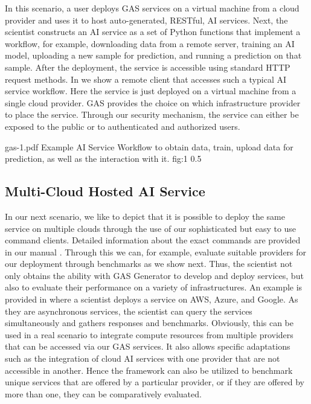 In this scenario, a user deploys GAS services on a virtual
machine from a cloud provider and uses it to host auto-generated,
RESTful, AI services. Next, the scientist constructs an AI service as
a set of Python functions that implement a workflow, for example,
downloading data from a remote server, training an AI model, uploading
a new sample for prediction, and running a prediction on that
sample. After the deployment, the service is accessible using standard
HTTP request methods. In  we show a remote client that
accesses such a typical AI service workflow.  Here the service is just
deployed on a virtual machine from a single cloud provider. GAS
provides the choice on which infrastructure provider to place the
service. Through our security mechanism, the service can either be
exposed to the public or to authenticated and authorized users.

\OneFIGURE
  {gas-1.pdf}
  {Example AI Service Workflow to obtain data, train, upload data for prediction, as well as the interaction with it.}
  {fig:1}
  {0.5}
    
\subsection{Multi-Cloud Hosted AI Service}

In our next scenario, we like to depict that it is possible to deploy
the same service on multiple clouds through the use of our
sophisticated but easy to use command clients. Detailed information
about the exact commands are provided in our
manual . Through this we can, for
example, evaluate suitable providers for our deployment through
benchmarks as we show next. Thus, the scientist not only obtains the
ability with GAS Generator to develop and deploy services, but also to
evaluate their performance on a variety of infrastructures. An example
is provided in  where a scientist deploys
a service on AWS, Azure, and Google. As they are asynchronous
services, the scientist can query the services simultaneously and
gathers responses and benchmarks. Obviously, this can be used in a
real scenario to integrate compute resources from multiple providers
that can be accessed via our GAS services. It also allows specific
adaptations such as the integration of cloud AI services with one
provider that are not accessible in another. Hence the framework can
also be utilized to benchmark unique services that are offered by a
particular provider, or if they are offered by more than one, they can
be comparatively evaluated.


